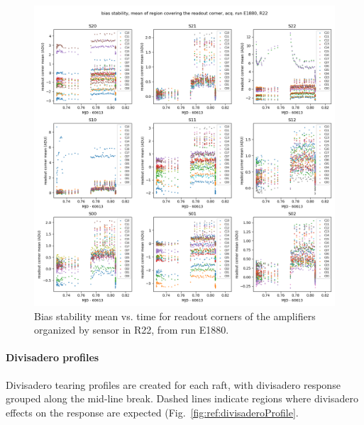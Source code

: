 \begin{figure}[ht]
    \centering
    \includegraphics[width=0.8\linewidth]{figures/ReferenceFigures/bias_rc_mean_vs_time_plot_LSSTCam_R22_S00_u_lsstccs_eo_bias_stability_E1880_w_2024_35_20241101T020021Z.png}
    \caption{Bias stability mean vs. time for readout corners of the amplifiers organized by sensor in R22, from run E1880.}
    \label{fig:ref:biasStability}
\end{figure}
\clearpage

\paragraph{Divisadero profiles}

Divisadero tearing profiles are created for each raft, with divisadero response grouped along the mid-line break. Dashed lines indicate regions where divisadero effects on the response are expected (Fig.~\ref{fig:ref:divisaderoProfile}.

